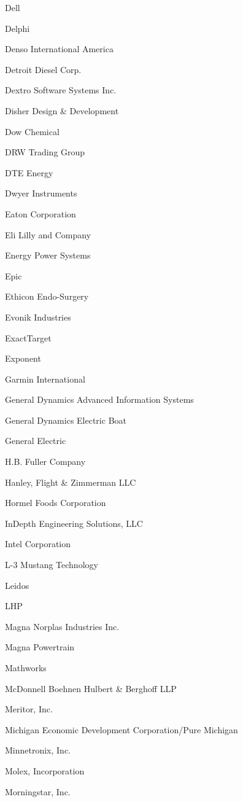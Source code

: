 \documentclass[twoside]{article}
\begin{document}
\begin{center}
\begin{multicols}{5}
\begin{FlushLeft}
\begin{compactitem}
\item Dell
\item Delphi
\item Denso International America
\item Detroit Diesel Corp.
\item Dextro Software Systems Inc.
\item Disher Design \& Development
\item Dow Chemical
\item DRW Trading Group
\item DTE Energy
\item Dwyer Instruments
\item Eaton Corporation
\item Eli Lilly and Company
\item Energy Power Systems
\item Epic
\item Ethicon Endo-Surgery
\item Evonik Industries
\item ExactTarget
\item Exponent
\item Garmin International
\item General Dynamics Advanced Information Systems
\item General Dynamics Electric Boat
\item General Electric
\item H.B. Fuller Company
\item Hanley, Flight \& Zimmerman LLC
\item Hormel Foods Corporation
\item InDepth Engineering Solutions, LLC
\item Intel Corporation
\item L-3 Mustang Technology
\item Leidos
\item LHP
\item Magna Norplas Industries Inc.
\item Magna Powertrain
\item Mathworks
\item McDonnell Boehnen Hulbert \& Berghoff LLP
\item Meritor, Inc.
\item Michigan Economic Development Corporation/Pure Michigan
\item Minnetronix, Inc.
\item Molex, Incorporation
\item Morningstar, Inc.

\end{compactitem}
\end{FlushLeft}
\end{multicols}
\end{center}
\end{document}
